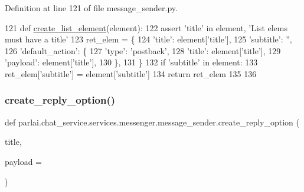 Definition at line 121 of file message\+\_\+sender.\+py.


\begin{DoxyCode}
121 \textcolor{keyword}{def }\hyperlink{namespaceparlai_1_1chat__service_1_1services_1_1messenger_1_1message__sender_a25b4cf40191d466edc7f8da108326f8c}{create\_list\_element}(element):
122     \textcolor{keyword}{assert} \textcolor{stringliteral}{'title'} \textcolor{keywordflow}{in} element, \textcolor{stringliteral}{'List elems must have a title'}
123     ret\_elem = \{
124         \textcolor{stringliteral}{'title'}: element[\textcolor{stringliteral}{'title'}],
125         \textcolor{stringliteral}{'subtitle'}: \textcolor{stringliteral}{''},
126         \textcolor{stringliteral}{'default\_action'}: \{
127             \textcolor{stringliteral}{'type'}: \textcolor{stringliteral}{'postback'},
128             \textcolor{stringliteral}{'title'}: element[\textcolor{stringliteral}{'title'}],
129             \textcolor{stringliteral}{'payload'}: element[\textcolor{stringliteral}{'title'}],
130         \},
131     \}
132     \textcolor{keywordflow}{if} \textcolor{stringliteral}{'subtitle'} \textcolor{keywordflow}{in} element:
133         ret\_elem[\textcolor{stringliteral}{'subtitle'}] = element[\textcolor{stringliteral}{'subtitle'}]
134     \textcolor{keywordflow}{return} ret\_elem
135 
136 
\end{DoxyCode}
\mbox{\label{namespaceparlai_1_1chat__service_1_1services_1_1messenger_1_1message__sender_a895e006007913ad0fde9c2c9bf9ec5a5}} 
\subsubsection{\texorpdfstring{create\+\_\+reply\+\_\+option()}{create\_reply\_option()}}
{\footnotesize\ttfamily def parlai.\+chat\+\_\+service.\+services.\+messenger.\+message\+\_\+sender.\+create\+\_\+reply\+\_\+option (\begin{DoxyParamCaption}\item[{}]{title,  }\item[{}]{payload = {\ttfamily \textquotesingle{}\textquotesingle{}} }\end{DoxyParamCaption})}

